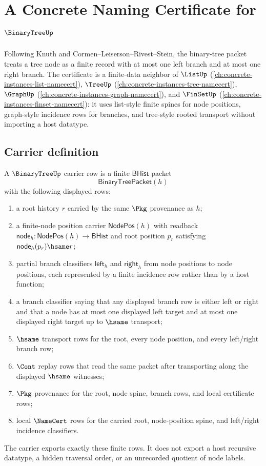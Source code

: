 \chapter{A Concrete Naming Certificate for $\BinaryTreeUp$}
\label{ch:concrete-instances-binary-tree-namecert}

Following Knuth and Cormen--Leiserson--Rivest--Stein, the binary-tree packet treats a tree node as a finite record with at most one left branch and at most one right branch. The certificate is a finite-data neighbor of $\ListUp$ (\autoref{ch:concrete-instances-list-namecert}), $\TreeUp$ (\autoref{ch:concrete-instances-tree-namecert}), $\GraphUp$ (\autoref{ch:concrete-instances-graph-namecert}), and $\FinSetUp$ (\autoref{ch:concrete-instances-finset-namecert}): it uses list-style finite spines for node positions, graph-style incidence rows for branches, and tree-style rooted transport without importing a host datatype.

\section{Carrier definition}
\label{sec:binary-tree-carrier}

\begin{definition}
\label{def:binary-tree-carrier}
A $\BinaryTreeUp$ carrier row is a finite $\mathsf{BHist}$ packet
$$
\mathsf{BinaryTreePacket}(h)
$$
with the following displayed rows:
\begin{enumerate}
\item a root history $r$ carried by the same $\Pkg$ provenance as $h$;
\item a finite-node position carrier $\mathsf{NodePos}(h)$ with readback $\mathsf{node}_h:\mathsf{NodePos}(h)\to\mathsf{BHist}$ and root position $p_r$ satisfying $\mathsf{node}_h(p_r)\hsame r$;
\item partial branch classifiers $\mathsf{left}_h$ and $\mathsf{right}_h$ from node positions to node positions, each represented by a finite incidence row rather than by a host function;
\item a branch classifier saying that any displayed branch row is either left or right and that a node has at most one displayed left target and at most one displayed right target up to $\hsame$ transport;
\item $\hsame$ transport rows for the root, every node position, and every left/right branch row;
\item $\Cont$ replay rows that read the same packet after transporting along the displayed $\hsame$ witnesses;
\item $\Pkg$ provenance for the root, node spine, branch rows, and local certificate rows;
\item local $\NameCert$ rows for the carried root, node-position spine, and left/right incidence classifiers.
\end{enumerate}
The carrier exports exactly these finite rows. It does not export a host recursive datatype, a hidden traversal order, or an unrecorded quotient of node labels.
\end{definition}

